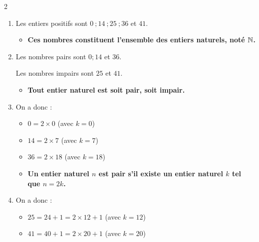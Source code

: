 \documentclass[10pt, a4paper]{article}
\begin{document}
\vspace{0.2cm}

\begin{multicols*}{2}

\begin{Solution}[ACTIVITÉ][1]
\begin{enumerate}[leftmargin=*,itemsep=0.5pt]
    \item Les entiers positifs sont $0 ~; 14 ~; 25 ~; 36$ et $41$.
    \begin{itemize}[label=$\blacktriangleright$, leftmargin=*, nosep]
    \item \textbf{Ces nombres constituent l'ensemble des \textcolor{PrimaryColor}{entiers naturels}, noté $\mathbb{N}$.}
    \end{itemize}

    \item Les nombres pairs sont $0 ; 14$ et $36$.

    Les nombres impairs sont $25$ et $41$.

    \begin{itemize}[label=$\blacktriangleright$, leftmargin=*, nosep]
    \item \textbf{Tout entier naturel est soit \textcolor{PrimaryColor}{pair}, soit \textcolor{PrimaryColor}{impair}.}
    \end{itemize}

    \item On a donc :
    \begin{itemize}[leftmargin=*,itemsep=0.5pt]
        \item $0 = 2 \times 0$ (avec $k=0$)

        \item $14 = 2 \times 7$ (avec $k=7$)

        \item $36 = 2 \times 18$ (avec $k=18$)
    \end{itemize}

    \begin{itemize}[label=$\blacktriangleright$, leftmargin=*, nosep]
    \item \textbf{Un entier naturel $n$ est \textcolor{PrimaryColor}{pair} s'il existe un entier naturel $k$ tel que $n = 2k$.}
    \end{itemize}

    \item On a donc :
    \begin{itemize}[leftmargin=*,itemsep=0.5pt]
        \item $25 = 24 + 1 = 2 \times 12 + 1$ (avec $k=12$)
        \item $41 = 40 + 1 = 2 \times 20 + 1$ (avec $k=20$)
    \end{itemize}


\end{enumerate}
\end{Solution}
\end{multicols*}
\end{document}
